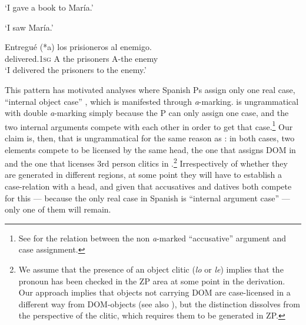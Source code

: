 \documentclass[output=paper,modfonts,nonflat,newtxmath,colorlinks,citecolor=brown]{langsci/langscibook}
\begin{document}
\ea%
    \label{ex:cabre:19}
      \jambox*{[dative]}
    \glt ‘I gave a book to María.’

    \jambox{[accusative]}
    \glt  ‘I saw María.’
    \z
    \z

\ea%
    \label{ex:cabre:20}
    \gll Entregué (*a) los prisioneros al enemigo.\\
        delivered.\textsc{1sg} A  the prisoners  A-the  enemy\\
    \glt ‘I delivered the prisoners to the enemy.’
    \z

This pattern has motivated analyses where Spanish {\liv}Ps assign only one real case, ``internal object case'' \citep{Romero2012, OrmazabalRomero2013Probus}, which is manifested through \textit{a}{}-marking.  is ungrammatical with double \textit{a}-marking simply because the {\liv}P can only assign one case, and the two internal arguments compete with each other in order to get that case.\footnote{See \citet{Romero2012} for the relation between the non \textit{a}{}-marked ``accusative'' argument and case assignment.}  Our claim is, then, that  is ungrammatical for the same reason as : in both cases, two elements compete to be licensed by the same head, the one that assigns DOM in  and the one that licenses 3rd person clitics in .\footnote{We assume that the presence of an object clitic (\textit{lo} or \textit{le}) implies that the pronoun has been checked in the ZP area at some point in the derivation. Our approach implies that objects not carrying DOM are case-licensed in a different way from DOM-objects (see also \citealt{López2012}), but the distinction dissolves from the perspective of the clitic, which requires them to be generated in ZP.} Irrespectively of whether they are generated in different regions, at some point they will have to establish a case-relation with a head, and given that accusatives and datives both compete for this — because the only real case in Spanish is ``internal argument case'' — only one of them will remain.

    \z
\end{document}
